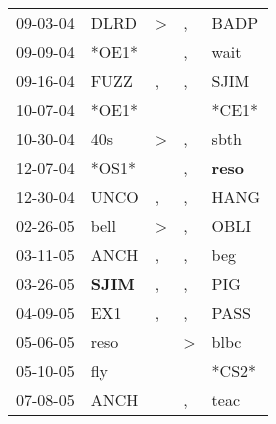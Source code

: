 \begin{supertabular}{p{0.07\textwidth}p{0.06\textwidth}p{0.02\textwidth}p{0.02\textwidth}p{0.06\textwidth}}
          09-03-04\textsuperscript{} &           DLRD\textsuperscript{} &     \textgreater &                , &           BADP\textsuperscript{} \\
          09-09-04\textsuperscript{} &                            *OE1* &                  &                , &           wait\textsuperscript{} \\
          09-16-04\textsuperscript{} &           FUZZ\textsuperscript{} &                , &                , &           SJIM\textsuperscript{} \\
          10-07-04\textsuperscript{} &                            *OE1* &                  &                  &                            *CE1* \\
          10-30-04\textsuperscript{} &            40s\textsuperscript{} &     \textgreater &                , &           sbth\textsuperscript{} \\
          12-07-04\textsuperscript{} &                            *OS1* &                  &                , &  \textbf{reso\textsuperscript{}} \\
          12-30-04\textsuperscript{} &           UNCO\textsuperscript{} &                , &                , &           HANG\textsuperscript{} \\
          02-26-05\textsuperscript{} &           bell\textsuperscript{} &     \textgreater &                , &           OBLI\textsuperscript{} \\
          03-11-05\textsuperscript{} &           ANCH\textsuperscript{} &                , &                , &            beg\textsuperscript{} \\
          03-26-05\textsuperscript{} &  \textbf{SJIM\textsuperscript{}} &                , &                , &            PIG\textsuperscript{} \\
          04-09-05\textsuperscript{} &            EX1\textsuperscript{} &                , &                , &           PASS\textsuperscript{} \\
          05-06-05\textsuperscript{} &           reso\textsuperscript{} &                  &     \textgreater &           blbc\textsuperscript{} \\
          05-10-05\textsuperscript{} &            fly\textsuperscript{} &                  &                  &                            *CS2* \\
          07-08-05\textsuperscript{} &           ANCH\textsuperscript{} &                  &                , &           teac\textsuperscript{} \\

\end{supertabular}
